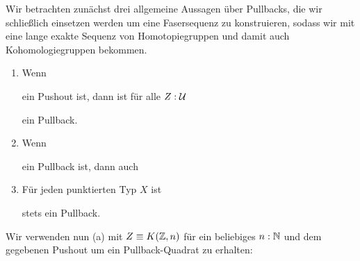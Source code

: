 \begin{beweis}
  Wir betrachten zunächst drei allgemeine Aussagen über Pullbacks, die wir schließlich einsetzen werden um eine Fasersequenz zu konstruieren, sodass wir mit  eine lange exakte Sequenz von Homotopiegruppen und damit auch Kohomologiegruppen bekommen.
  \begin{enumerate}
  \item Wenn
    \begin{center}
    \end{center}
    ein Pushout ist, dann ist für alle \(Z:\mathcal{U}\)
    \begin{center}
    \end{center}
    ein Pullback.
  \item Wenn 
    \begin{center}
    \end{center}
    ein Pullback ist, dann auch
    \begin{center}
    \end{center}
  \item Für jeden punktierten Typ \(X\) ist
    \begin{center}
    \end{center}
     stets ein Pullback.    
   \end{enumerate}
   Wir verwenden nun (a) mit \(Z\equiv K(\mathbb{Z},n)\) für ein beliebiges \(n:\mathbb{N}\) und dem gegebenen Pushout um ein Pullback-Quadrat zu erhalten:

\end{beweis}
